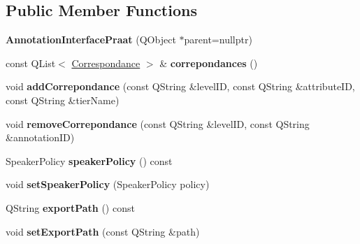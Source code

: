 \subsection*{Public Member Functions}
\begin{DoxyCompactItemize}
\item 
\mbox{\label{class_annotation_interface_praat_a742fd0b5a46159d7d9ccde87729ba878}} 
{\bfseries Annotation\+Interface\+Praat} (Q\+Object $\ast$parent=nullptr)
\item 
\mbox{\label{class_annotation_interface_praat_a6d487efc89a9d444c6a11852c4e68243}} 
const Q\+List$<$ \hyperlink{class_annotation_interface_praat_1_1_correspondance}{Correspondance} $>$ \& {\bfseries correpondances} ()
\item 
\mbox{\label{class_annotation_interface_praat_a3929379280fe84709cee5e85e63ab5dc}} 
void {\bfseries add\+Correpondance} (const Q\+String \&level\+ID, const Q\+String \&attribute\+ID, const Q\+String \&tier\+Name)
\item 
\mbox{\label{class_annotation_interface_praat_a1fcd0aa76675e6a6cbd5f0ae434755d8}} 
void {\bfseries remove\+Correpondance} (const Q\+String \&level\+ID, const Q\+String \&annotation\+ID)
\item 
\mbox{\label{class_annotation_interface_praat_a31e83b4a9cd6ab92a63509473e07346e}} 
Speaker\+Policy {\bfseries speaker\+Policy} () const
\item 
\mbox{\label{class_annotation_interface_praat_a0ae5a22c03e93422d87741b64d672677}} 
void {\bfseries set\+Speaker\+Policy} (Speaker\+Policy policy)
\item 
\mbox{\label{class_annotation_interface_praat_a00e9784212e59a965ba03984c7691ac8}} 
Q\+String {\bfseries export\+Path} () const
\item 
\mbox{\label{class_annotation_interface_praat_a1a7ff3de2f1b501e237dcec2a33b47f8}} 
void {\bfseries set\+Export\+Path} (const Q\+String \&path)

\end{DoxyCompactItemize}
